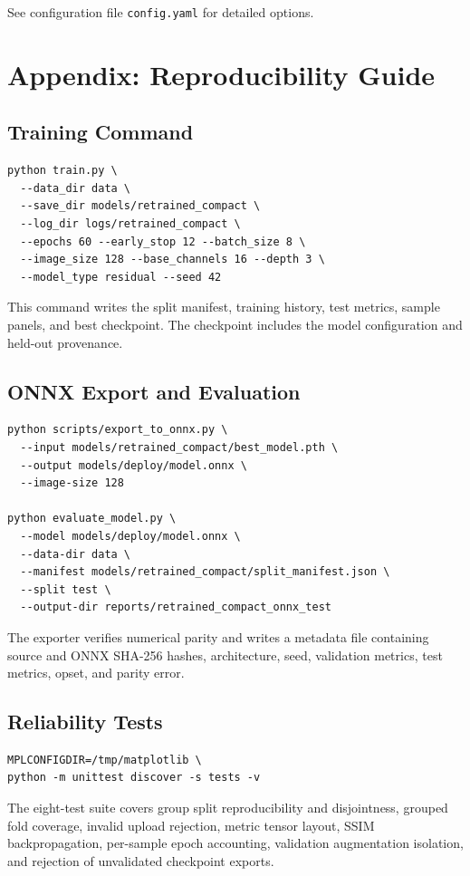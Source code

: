 \documentclass[12pt,a4paper]{report}
\begin{document}
See configuration file \texttt{config.yaml} for detailed options.

\fi

\chapter*{Appendix: Reproducibility Guide}

\section*{Training Command}

\begin{verbatim}
python train.py \
  --data_dir data \
  --save_dir models/retrained_compact \
  --log_dir logs/retrained_compact \
  --epochs 60 --early_stop 12 --batch_size 8 \
  --image_size 128 --base_channels 16 --depth 3 \
  --model_type residual --seed 42
\end{verbatim}

This command writes the split manifest, training history, test metrics, sample panels, and best checkpoint. The checkpoint includes the model configuration and held-out provenance.

\section*{ONNX Export and Evaluation}

\begin{verbatim}
python scripts/export_to_onnx.py \
  --input models/retrained_compact/best_model.pth \
  --output models/deploy/model.onnx \
  --image-size 128

python evaluate_model.py \
  --model models/deploy/model.onnx \
  --data-dir data \
  --manifest models/retrained_compact/split_manifest.json \
  --split test \
  --output-dir reports/retrained_compact_onnx_test
\end{verbatim}

The exporter verifies numerical parity and writes a metadata file containing source and ONNX SHA-256 hashes, architecture, seed, validation metrics, test metrics, opset, and parity error.

\section*{Reliability Tests}

\begin{verbatim}
MPLCONFIGDIR=/tmp/matplotlib \
python -m unittest discover -s tests -v
\end{verbatim}

The eight-test suite covers group split reproducibility and disjointness, grouped fold coverage, invalid upload rejection, metric tensor layout, SSIM backpropagation, per-sample epoch accounting, validation augmentation isolation, and rejection of unvalidated checkpoint exports.
\end{document}
